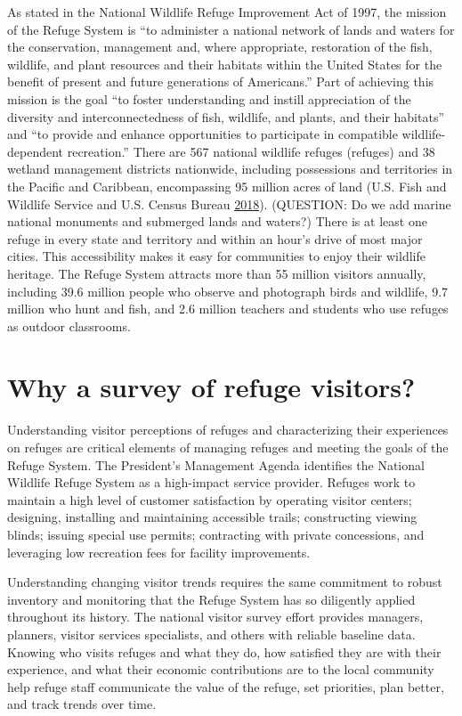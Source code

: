\documentclass[]{book}
\begin{document}
As stated in the National Wildlife Refuge Improvement Act of 1997, the
mission of the Refuge System is ``to administer a national network of
lands and waters for the conservation, management and, where
appropriate, restoration of the fish, wildlife, and plant resources and
their habitats within the United States for the benefit of present and
future generations of Americans.'' Part of achieving this mission is the
goal ``to foster understanding and instill appreciation of the diversity
and interconnectedness of fish, wildlife, and plants, and their
habitats'' and ``to provide and enhance opportunities to participate in
compatible wildlife-dependent recreation.'' There are 567 national
wildlife refuges (refuges) and 38 wetland management districts
nationwide, including possessions and territories in the Pacific and
Caribbean, encompassing 95 million acres of land (U.S. Fish and Wildlife
Service and U.S. Census Bureau \protect\hyperlink{ref-USFWS2018}{2018}).
(QUESTION: Do we add marine national monuments and submerged lands and
waters?) There is at least one refuge in every state and territory and
within an hour's drive of most major cities. This accessibility makes it
easy for communities to enjoy their wildlife heritage. The Refuge System
attracts more than 55 million visitors annually, including 39.6 million
people who observe and photograph birds and wildlife, 9.7 million who
hunt and fish, and 2.6 million teachers and students who use refuges as
outdoor classrooms.

\section{Why a survey of refuge
visitors?}\label{why-a-survey-of-refuge-visitors}

Understanding visitor perceptions of refuges and characterizing their
experiences on refuges are critical elements of managing refuges and
meeting the goals of the Refuge System. The President's Management
Agenda identifies the National Wildlife Refuge System as a high-impact
service provider. Refuges work to maintain a high level of customer
satisfaction by operating visitor centers; designing, installing and
maintaining accessible trails; constructing viewing blinds; issuing
special use permits; contracting with private concessions, and
leveraging low recreation fees for facility improvements.

Understanding changing visitor trends requires the same commitment to
robust inventory and monitoring that the Refuge System has so diligently
applied throughout its history. The national visitor survey effort
provides managers, planners, visitor services specialists, and others
with reliable baseline data. Knowing who visits refuges and what they
do, how satisfied they are with their experience, and what their
economic contributions are to the local community help refuge staff
communicate the value of the refuge, set priorities, plan better, and
track trends over time.
\end{document}
